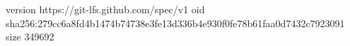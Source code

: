 version https://git-lfs.github.com/spec/v1
oid sha256:279cc6a8fd4b1474b74738e3fe13d336b4e930f0fe78b61faa0d7432c7923091
size 349692
